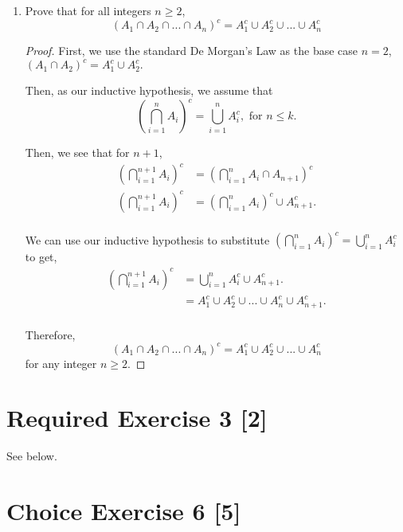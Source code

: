 \documentclass{article}
\begin{document}
\begin{enumerate}
    \item {
        Prove that for all integers \(n \ge 2\), 
        \[\left( A_1 \cap A_2 \cap ... \cap A_n \right)^c = A_1^c \cup A_2^c \cup ... \cup A_n^c \]

        \begin{proof}
            First, we use the standard De Morgan's Law as the base case \(n=2\),
            \(\left( A_1 \cap A_2 \right)^c = A_1^c \cup A_2^c.\)

            Then, as our inductive hypothesis, we assume that 
            \[ \left( \bigcap_{i=1}^{n} A_i \right)^c = \bigcup_{i=1}^{n} A_i^c, \text{ for } n \le k.\]

            Then, we see that for \(n+1\), 
            \begin{align*}
                \left( \bigcap_{i=1}^{n+1} A_i \right)^c &= \left( \bigcap_{i=1}^{n} A_i \cap A_{n+1} \right)^c \\
                \left( \bigcap_{i=1}^{n+1} A_i \right)^c &= \left( \bigcap_{i=1}^{n} A_i \right)^c \cup A_{n+1}^c .\\
            \end{align*}

            We can use our inductive hypothesis to substitute 
            \(\left( \bigcap_{i=1}^{n} A_i \right)^c = \bigcup_{i=1}^{n} A_i^c\)
            to get,
            \begin{align*}
                \left( \bigcap_{i=1}^{n+1} A_i \right)^c &= \bigcup_{i=1}^{n} A_i^c \cup A_{n+1}^c .\\
                &= A_1^c \cup A_2^c \cup ... \cup A_n^c \cup A_{n+1}^c .\\
            \end{align*}

            Therefore, 
            \[\left( A_1 \cap A_2 \cap ... \cap A_n \right)^c = A_1^c \cup A_2^c \cup ... \cup A_n^c \]
            for any integer \(n \ge 2\).
        \end{proof}
    }
\end{enumerate}

\section*{Required Exercise 3 [2]}
See below.

\section*{Choice Exercise 6 [5]}
\end{document}
